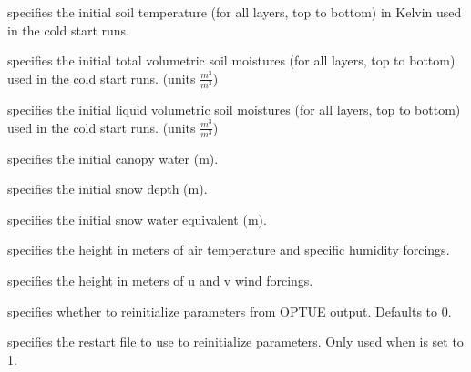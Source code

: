  specifies the initial soil temperature (for all layers,
 top to bottom) in Kelvin used in the cold start runs.

  specifies the
 initial total volumetric soil moistures (for all layers,
 top to bottom) used in the cold start runs.
 (units $\frac{m^3}{m^3}$)

  specifies the
 initial liquid volumetric soil moistures (for all layers,
 top to bottom) used in the cold start runs.
 (units $\frac{m^3}{m^3}$)

  specifies the initial
 canopy water (m).

  specifies the initial
 snow depth (m).

  specifies the initial
 snow water equivalent (m).

  specifies the
 height in meters of air temperature and specific humidity forcings.

  specifies the
 height in meters of u and v wind forcings.

  specifies
 whether to reinitialize parameters from OPTUE output.
 Defaults to 0.

  specifies the
 restart file to use to reinitialize parameters.
 Only used when
 is set to 1.
 

